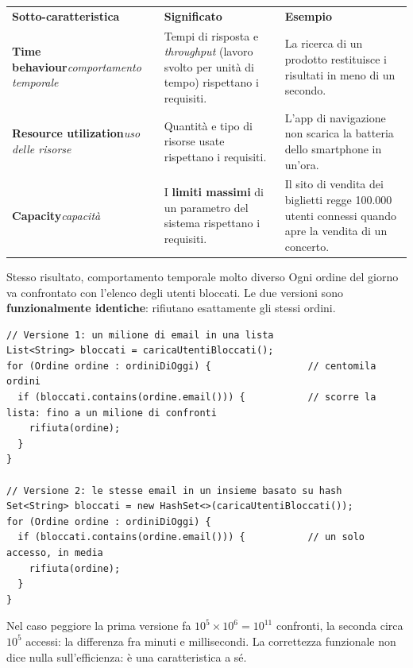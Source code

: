 \begin{table}[H]
\centering
\renewcommand{\arraystretch}{1.4}
\begin{tabularx}{\textwidth}{P{3.6cm} L L}
\textbf{Sotto-caratteristica} & \textbf{Significato} & \textbf{Esempio} \\
\textbf{Time behaviour}\newline\textit{\small comportamento temporale} & Tempi di risposta e \textit{throughput} (lavoro svolto per unità di tempo) rispettano i requisiti. & La ricerca di un prodotto restituisce i risultati in meno di un secondo. \\
\textbf{Resource utilization}\newline\textit{\small uso delle risorse} & Quantità e tipo di risorse usate rispettano i requisiti. & L'app di navigazione non scarica la batteria dello smartphone in un'ora. \\
\textbf{Capacity}\newline\textit{\small capacità} & I \textbf{limiti massimi} di un parametro del sistema rispettano i requisiti. & Il sito di vendita dei biglietti regge 100.000 utenti connessi quando apre la vendita di un concerto. \\
\bottomrule
\end{tabularx}
\end{table}

\begin{esempio}{Stesso risultato, comportamento temporale molto diverso}
Ogni ordine del giorno va confrontato con l'elenco degli utenti bloccati. Le due versioni sono \textbf{funzionalmente
identiche}: rifiutano esattamente gli stessi ordini.
\begin{lstlisting}[style=java, name=ControlloOrdini.java]
// Versione 1: un milione di email in una lista
List<String> bloccati = caricaUtentiBloccati();
for (Ordine ordine : ordiniDiOggi) {                 // centomila ordini
  if (bloccati.contains(ordine.email())) {           // scorre la lista: fino a un milione di confronti
    rifiuta(ordine);
  }
}

// Versione 2: le stesse email in un insieme basato su hash
Set<String> bloccati = new HashSet<>(caricaUtentiBloccati());
for (Ordine ordine : ordiniDiOggi) {
  if (bloccati.contains(ordine.email())) {           // un solo accesso, in media
    rifiuta(ordine);
  }
}
\end{lstlisting}
Nel caso peggiore la prima versione fa $10^5 \times 10^6 = 10^{11}$ confronti, la seconda circa $10^5$ accessi: la
differenza fra minuti e millisecondi. La correttezza funzionale non dice nulla sull'efficienza: è una caratteristica a sé.
\end{esempio}

